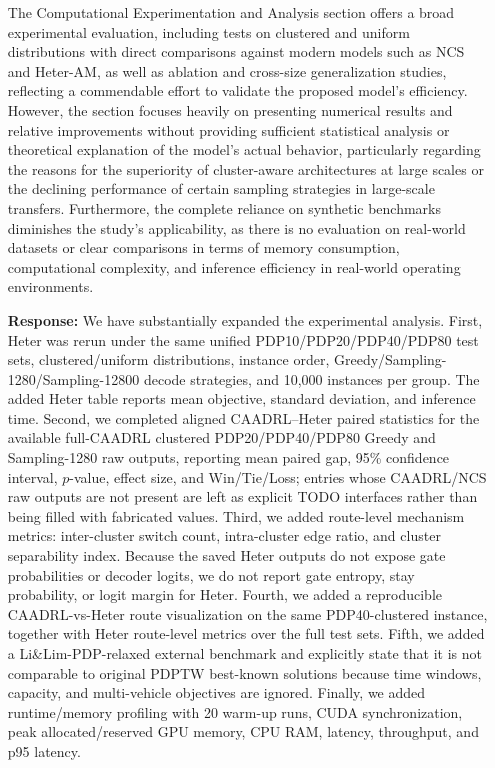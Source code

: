 \documentclass{article}
\begin{document}
\begin{itemize}
{The Computational Experimentation and Analysis section offers a broad experimental evaluation, including tests on clustered and uniform distributions with direct comparisons against modern models such as NCS and Heter-AM, as well as ablation and cross-size generalization studies, reflecting a commendable effort to validate the proposed model's efficiency. However, the section focuses heavily on presenting numerical results and relative improvements without providing sufficient statistical analysis or theoretical explanation of the model's actual behavior, particularly regarding the reasons for the superiority of cluster-aware architectures at large scales or the declining performance of certain sampling strategies in large-scale transfers. Furthermore, the complete reliance on synthetic benchmarks diminishes the study's applicability, as there is no evaluation on real-world datasets or clear comparisons in terms of memory consumption, computational complexity, and
inference efficiency in real-world operating environments.}


\item[\textbf{Response:}] We have substantially expanded the experimental analysis. First, Heter was rerun under the same unified PDP10/PDP20/PDP40/PDP80 test sets, clustered/uniform distributions, instance order, Greedy/Sampling-1280/Sampling-12800 decode strategies, and 10,000 instances per group. The added Heter table reports mean objective, standard deviation, and inference time. Second, we completed aligned CAADRL--Heter paired statistics for the available full-CAADRL clustered PDP20/PDP40/PDP80 Greedy and Sampling-1280 raw outputs, reporting mean paired gap, 95\% confidence interval, $p$-value, effect size, and Win/Tie/Loss; entries whose CAADRL/NCS raw outputs are not present are left as explicit TODO interfaces rather than being filled with fabricated values. Third, we added route-level mechanism metrics: inter-cluster switch count, intra-cluster edge ratio, and cluster separability index. Because the saved Heter outputs do not expose gate probabilities or decoder logits, we do not report gate entropy, stay probability, or logit margin for Heter. Fourth, we added a reproducible CAADRL-vs-Heter route visualization on the same PDP40-clustered instance, together with Heter route-level metrics over the full test sets. Fifth, we added a Li\&Lim-PDP-relaxed external benchmark and explicitly state that it is not comparable to original PDPTW best-known solutions because time windows, capacity, and multi-vehicle objectives are ignored. Finally, we added runtime/memory profiling with 20 warm-up runs, CUDA synchronization, peak allocated/reserved GPU memory, CPU RAM, latency, throughput, and p95 latency.



\end{itemize}
\end{document}
